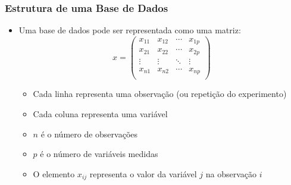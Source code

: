 \documentclass[12pt]{article}
\begin{document}
    \subsubsection{Estrutura de uma Base de Dados}
    \begin{itemize}
        \item Uma base de dados pode ser representada como uma matriz:
        \[ x = 
        \begin{pmatrix}
            x_{11} & x_{12} & \cdots & x_{1p} \\
            x_{21} & x_{22} & \cdots & x_{2p} \\
            \vdots & \vdots & \ddots & \vdots \\
            x_{n1} & x_{n2} & \cdots & x_{np} \\
        \end{pmatrix}
        \]
        \begin{itemize}
            \item Cada linha representa uma observação (ou repetição do 
            experimento)
            \item Cada coluna representa uma variável
            \item $n$ é o número de observações
            \item $p$ é o número de variáveis medidas
            \item O elemento $x_{ij}$ representa o valor da variável $j$ na 
            observação $i$
        \end{itemize}


\end{itemize}
\end{document}
